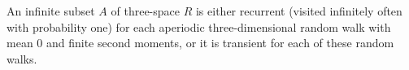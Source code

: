 An infinite subset $A$ of three-space $R$ is either recurrent (visited infinitely often with probability one) for each aperiodic three-dimensional random walk with mean 0 and finite second moments, or it is transient for each of these random walks.